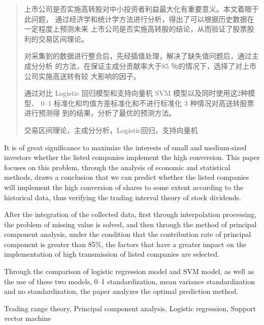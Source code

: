 \documentclass[../main]{subfiles}
\begin{document}
\begin{abstract}
  上市公司是否实施高转股对中小投资者利益最大化有重要意义。本文着眼于此问题，
  通过经济学和统计学方法进行分析，得出了可以根据历史数据在一定程度上预测未来
  上市公司是否实施高转股的结论，从而验证了股票股利的交易区间理论。

  对采集到的数据进行整合后，先经插值处理，解决了缺失值问题后，通过主成分分析
  的方法，在保证主成分贡献率大于85 ％的情况下，选择了对上市公司实施高送转有较
  大影响的因子。

  通过对比 Logistic 回归模型和支持向量机 SVM 模型以及同时使用这2种模型、 0--1
  标准化和均值方差标准化和不进行标准化 3 种情况对高送转股票进行预测得
  到的结果，分析了最优的预测方法。

  \begin{keyword}
    交易区间理论，主成分分析，Logistic回归，支持向量机
  \end{keyword}
\end{abstract}

\begin{abstract*}
  It is of great significance to maximize the interests of small and
  medium-sized investors whether the listed companies implement the high
  conversion. This paper focuses on this problem, through the analysis of
  economic and statistical methods, draws a conclusion that we can predict
  whether the listed companies will implement the high conversion of shares
  to some extent according to the historical data, thus verifying the trading
  interval theory of stock dividends.

  After the integration of the collected data, first through interpolation
  processing, the problem of missing value is solved, and then through the
  method of principal component analysis, under the condition that the
  contribution rate of principal component is greater than 85\%, the factors
  that have a greater impact on the implementation of high transmission of
  listed companies are selected.

  Through the comparison of logistic regression model and SVM model, as well
  as the use of these two models, 0--1 standardization, mean variance
  standardization and no standardization, the paper analyzes the optimal
  prediction method.

  \begin{keyword*}
    Trading range theory, Principal component analysis, Logistic regression,
    Support vector machine
  \end{keyword*}
\end{abstract*}
\end{document}
